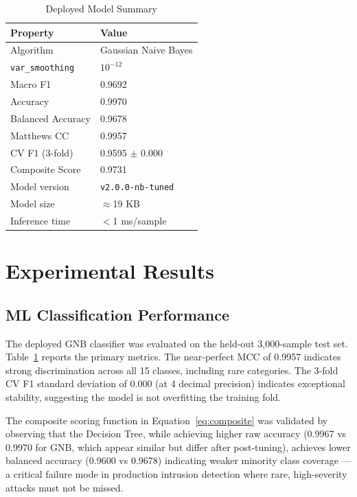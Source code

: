 \documentclass[conference]{IEEEtran}
\begin{document}
\begin{table}[h]
\caption{Deployed Model Summary}
\label{tab:winner}
\centering
\begin{tabular}{@{}ll@{}}
\toprule
\textbf{Property} & \textbf{Value} \\
\midrule
Algorithm       & Gaussian Naive Bayes \\
\texttt{var\_smoothing} & $10^{-12}$ \\
Macro F1        & 0.9692 \\
Accuracy        & 0.9970 \\
Balanced Accuracy & 0.9678 \\
Matthews CC     & 0.9957 \\
CV F1 (3-fold)  & 0.9595 $\pm$ 0.000 \\
Composite Score & 0.9731 \\
Model version   & \texttt{v2.0.0-nb-tuned} \\
Model size      & $\approx$19 KB \\
Inference time  & $<$1 ms/sample \\
\bottomrule
\end{tabular}
\end{table}

\section{Experimental Results}

\subsection{ML Classification Performance}

The deployed GNB classifier was evaluated on the held-out 3,000-sample test set. Table~\ref{tab:winner} reports the primary metrics. The near-perfect MCC of 0.9957 indicates strong discrimination across all 15 classes, including rare categories. The 3-fold CV F1 standard deviation of 0.000 (at 4 decimal precision) indicates exceptional stability, suggesting the model is not overfitting the training fold.

The composite scoring function in Equation~\ref{eq:composite} was validated by observing that the Decision Tree, while achieving higher raw accuracy (0.9967 vs 0.9970 for GNB, which appear similar but differ after post-tuning), achieves lower balanced accuracy (0.9600 vs 0.9678) indicating weaker minority class coverage — a critical failure mode in production intrusion detection where rare, high-severity attacks must not be missed.
\end{document}
